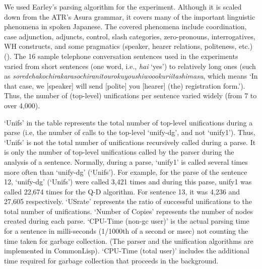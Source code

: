 We used Earley's parsing algorithm for the experiment.
Although it is scaled down from the ATR's {\sc Asura}
grammar, it covers many of the important linguistic
phenomena in spoken Japanese. The covered phenomena include
coordination, case adjunction, adjuncts, control, slash
categories, zero-pronouns, interrogatives, WH constructs,
and some pragmatics (speaker, hearer relations, politeness,
etc.)  (\cite{Yoshimoto}).  The 16 sample telephone
conversation sentences used in the experiments varied from
short sentences (one word, i.e., {\it hai} `yes') to
relatively long ones (such as {\it
soredehakochirakarasochiranitourokuyoushiwoookuriitashimasu},
which means `In that case, we [speaker] will send [polite]
you [hearer] (the) registration form.').  Thus, the number
of (top-level) unifications per sentence varied widely (from
7 to over 4,000).

`Unifs' in the table represents the total number of top-level
unifications during a parse (i.e, the number of calls to the top-level
`unify-dg', and not `unify1').  Thus, `Unifs' is not the total number
of unifications recursively called during a parse. It is only the
number of top-level unifications called by the parser during the
analysis of a sentence.  Normally, during a parse, `unify1' is called
several times more often than `unify-dg' (`Unifs').  For example, for
the parse of the sentence 12, `unify-dg' (`Unifs') were called 3,421
times and during this parse, unify1 was called 22,674 times for the
Q-D algorithm.  For sentence 13, it was 4,236 and 27,605 respectively.
`USrate' represents the ratio of successful unifications to the total
number of unifications.  `Number of Copies' represents the number of
nodes created during each parse. `CPU-Time (non-gc user)' is the
actual parsing time for a sentence in milli-seconds (1/1000th of a
second or msec) not counting the time taken for garbage collection. (The
parser and the unification algorithms are implemented in CommonLisp).
`CPU-Time (total user)' includes the additional time required for garbage
collection that proceeds in the background.

